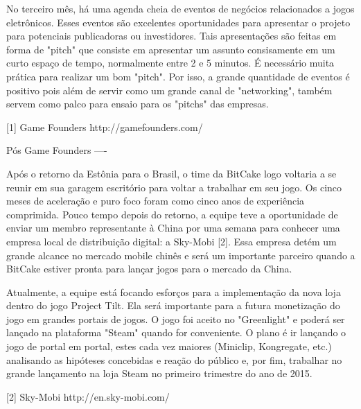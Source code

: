 No terceiro mês, há uma agenda cheia de eventos de negócios relacionados a jogos eletrônicos. Esses eventos são excelentes oportunidades para apresentar o projeto para potenciais publicadoras ou investidores. Tais apresentações são feitas em forma de "pitch" que consiste em apresentar um assunto consisamente em um curto espaço de tempo, normalmente entre 2 e 5 minutos. É necessário muita prática para realizar um bom "pitch". Por isso, a grande quantidade de eventos é positivo pois além de servir como um grande canal de "networking", também servem como palco para ensaio para os "pitchs" das empresas.

[1] Game Founders
http://gamefounders.com/


Pós Game Founders
----

Após o retorno da Estônia para o Brasil, o time da BitCake logo voltaria a se reunir em sua garagem escritório para voltar a trabalhar em seu jogo. Os cinco meses de aceleração e puro foco foram como cinco anos de experiência comprimida. Pouco tempo depois do retorno, a equipe teve a oportunidade de enviar um membro representante à China por uma semana para conhecer uma empresa local de distribuição digital: a Sky-Mobi [2]. Essa empresa detém um grande alcance no mercado mobile chinês e será um importante parceiro quando a BitCake estiver pronta para lançar jogos para o mercado da China.

Atualmente, a equipe está focando esforços para a implementação da nova loja dentro do jogo Project Tilt. Ela será importante para a futura monetização do jogo em grandes portais de jogos. O jogo foi aceito no "Greenlight" e poderá ser lançado na plataforma "Steam" quando for conveniente. O plano é ir lançando o jogo de portal em portal, estes cada vez maiores (Miniclip, Kongregate, etc.) analisando as hipóteses concebidas e reação do público e, por fim, trabalhar no grande lançamento na loja Steam no primeiro trimestre do ano de 2015.

[2] Sky-Mobi
http://en.sky-mobi.com/

